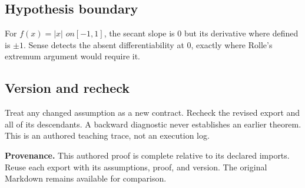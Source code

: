 \documentclass[preprint,12pt,aps,pra,showkeys,amsmath,amssymb,superscriptaddress,floatfix]{revtex4-2}
\theoremstyle{definition}
\theoremstyle{remark}
\begin{document}
\subsection{Hypothesis boundary}
For \(f(x)=|x|\) \(on[-1,1]\), the secant slope is 0 but its derivative
where defined is \(\pm 1\). Sense detects the absent differentiability
at 0, exactly where Rolle's extremum argument would require it.

\subsection{Version and recheck}
Treat any changed assumption as a new contract. Recheck the revised
export and all of its descendants. A backward diagnostic never
establishes an earlier theorem. This is an authored teaching trace, not
an execution log.

\par\medskip\begingroup\small\linespread{1.0}\selectfont\noindent\textbf{Provenance.} This authored proof is complete relative to its declared imports. Reuse
each export with its assumptions, proof, and version. The original
Markdown remains available for comparison.
\par\endgroup
\end{document}
